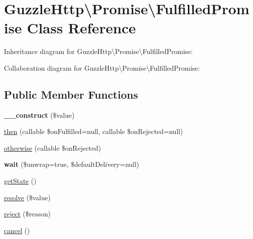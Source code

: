 \hypertarget{classGuzzleHttp_1_1Promise_1_1FulfilledPromise}{}\section{Guzzle\+Http\textbackslash{}Promise\textbackslash{}Fulfilled\+Promise Class Reference}
\label{classGuzzleHttp_1_1Promise_1_1FulfilledPromise}


Inheritance diagram for Guzzle\+Http\textbackslash{}Promise\textbackslash{}Fulfilled\+Promise\+:


Collaboration diagram for Guzzle\+Http\textbackslash{}Promise\textbackslash{}Fulfilled\+Promise\+:
\subsection*{Public Member Functions}
\begin{DoxyCompactItemize}
\item 
\mbox{\label{classGuzzleHttp_1_1Promise_1_1FulfilledPromise_a5e530312b92fd116bedf2ffc359a6526}} 
{\bfseries \+\_\+\+\_\+construct} (\$value)
\item 
\hyperlink{classGuzzleHttp_1_1Promise_1_1FulfilledPromise_aecac67e3bd3294aae15a10748b81c155}{then} (callable \$on\+Fulfilled=null, callable \$on\+Rejected=null)
\item 
\hyperlink{classGuzzleHttp_1_1Promise_1_1FulfilledPromise_a15a81208044c38ea1d3128094431cf7f}{otherwise} (callable \$on\+Rejected)
\item 
\mbox{\label{classGuzzleHttp_1_1Promise_1_1FulfilledPromise_a9a3809a7fc0e61a10af619535ce06fb3}} 
{\bfseries wait} (\$unwrap=true, \$default\+Delivery=null)
\item 
\hyperlink{classGuzzleHttp_1_1Promise_1_1FulfilledPromise_a573e5b00f2e5a280190d101a128a4748}{get\+State} ()
\item 
\hyperlink{classGuzzleHttp_1_1Promise_1_1FulfilledPromise_aa4e349787515ae99e597a91f7f7e5dbe}{resolve} (\$value)
\item 
\hyperlink{classGuzzleHttp_1_1Promise_1_1FulfilledPromise_ade4ba1e0f6c27517479dc427372c2290}{reject} (\$reason)
\item 
\hyperlink{classGuzzleHttp_1_1Promise_1_1FulfilledPromise_a2a1ed3ce2a277fef457c47e347ce3b8a}{cancel} ()
\end{DoxyCompactItemize}
